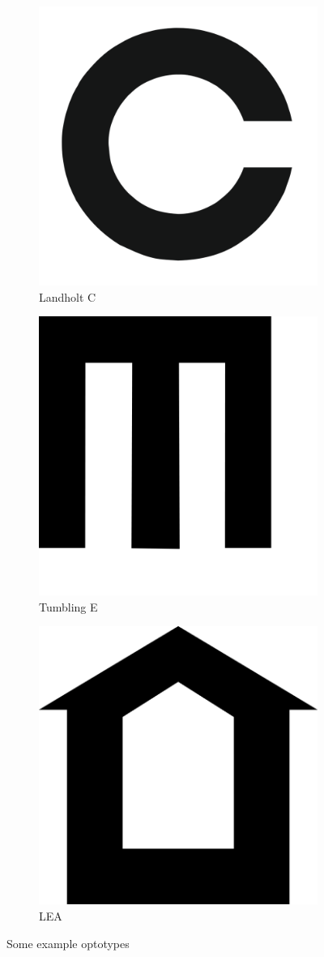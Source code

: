 \documentclass[12pt,a4paper,notitlepage]{report}
\begin{document}
\begin{figure}[ht!]
\centering
\begin{subfigure}{.3\textwidth}
  \centering
  \includegraphics[width=.4\linewidth]{images/landholt_c_optotype.png}
  \caption{Landholt C}
  \label{fig:landholt_c}
\end{subfigure}%
\begin{subfigure}{.3\textwidth}
  \centering
  \includegraphics[width=.4\linewidth]{images/tumbling_e_optotype.png}
  \caption{Tumbling E}
  \label{fig:tumbling_e}
\end{subfigure}
\begin{subfigure}{.3\textwidth}
  \centering
  \includegraphics[width=.4\linewidth]{images/lea_optotype.png}
  \caption{LEA}
  \label{fig:lea}
\end{subfigure}
\caption{Some example optotypes}
\label{fig:optotypes_example}
\end{figure}
\end{document}

